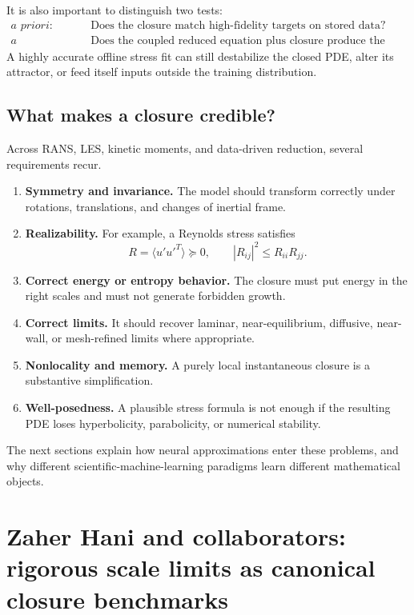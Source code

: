 \documentclass[11pt]{article}
\begin{document}
It is also important to distinguish two tests:
\begin{align*}
\textit{a priori:}&\quad
\text{Does the closure match high-fidelity targets on stored data?}\\
\textit{a posteriori:}&\quad
\text{Does the coupled reduced equation plus closure produce the correct evolution?}
\end{align*}
A highly accurate offline stress fit can still destabilize the closed PDE, alter its attractor, or feed itself inputs outside the training distribution.

\subsection{What makes a closure credible?}

Across RANS, LES, kinetic moments, and data-driven reduction, several requirements recur.

\begin{enumerate}
  \item \textbf{Symmetry and invariance.} The model should transform correctly under rotations, translations, and changes of inertial frame.
  \item \textbf{Realizability.} For example, a Reynolds stress satisfies
  \[
  R=\langle u'u'^{T}\rangle\succeq0,
  \qquad
  |R_{ij}|^2\le R_{ii}R_{jj}.
  \]
  \item \textbf{Correct energy or entropy behavior.} The closure must put energy in the right scales and must not generate forbidden growth.
  \item \textbf{Correct limits.} It should recover laminar, near-equilibrium, diffusive, near-wall, or mesh-refined limits where appropriate.
  \item \textbf{Nonlocality and memory.} A purely local instantaneous closure is a substantive simplification.
  \item \textbf{Well-posedness.} A plausible stress formula is not enough if the resulting PDE loses hyperbolicity, parabolicity, or numerical stability.
\end{enumerate}

The next sections explain how neural approximations enter these problems, and why different scientific-machine-learning paradigms learn different mathematical objects.

\section{Zaher Hani and collaborators: rigorous scale limits as canonical closure benchmarks}
\end{document}
